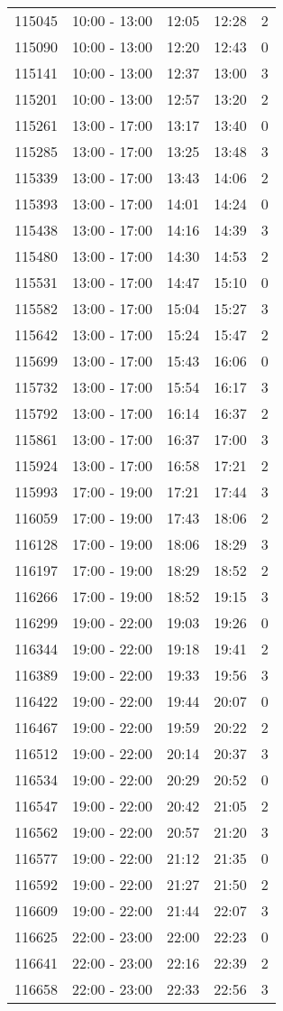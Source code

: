 \documentclass{article}
\begin{document}
\begin{tabular}{llccc}
115045 & 10:00 - 13:00 & 12:05 & 12:28 & 2 \\
115090 & 10:00 - 13:00 & 12:20 & 12:43 & 0 \\
115141 & 10:00 - 13:00 & 12:37 & 13:00 & 3 \\
115201 & 10:00 - 13:00 & 12:57 & 13:20 & 2 \\
115261 & 13:00 - 17:00 & 13:17 & 13:40 & 0 \\
115285 & 13:00 - 17:00 & 13:25 & 13:48 & 3 \\
115339 & 13:00 - 17:00 & 13:43 & 14:06 & 2 \\
115393 & 13:00 - 17:00 & 14:01 & 14:24 & 0 \\
115438 & 13:00 - 17:00 & 14:16 & 14:39 & 3 \\
115480 & 13:00 - 17:00 & 14:30 & 14:53 & 2 \\
115531 & 13:00 - 17:00 & 14:47 & 15:10 & 0 \\
115582 & 13:00 - 17:00 & 15:04 & 15:27 & 3 \\
115642 & 13:00 - 17:00 & 15:24 & 15:47 & 2 \\
115699 & 13:00 - 17:00 & 15:43 & 16:06 & 0 \\
115732 & 13:00 - 17:00 & 15:54 & 16:17 & 3 \\
115792 & 13:00 - 17:00 & 16:14 & 16:37 & 2 \\
115861 & 13:00 - 17:00 & 16:37 & 17:00 & 3 \\
115924 & 13:00 - 17:00 & 16:58 & 17:21 & 2 \\
115993 & 17:00 - 19:00 & 17:21 & 17:44 & 3 \\
116059 & 17:00 - 19:00 & 17:43 & 18:06 & 2 \\
116128 & 17:00 - 19:00 & 18:06 & 18:29 & 3 \\
116197 & 17:00 - 19:00 & 18:29 & 18:52 & 2 \\
116266 & 17:00 - 19:00 & 18:52 & 19:15 & 3 \\
116299 & 19:00 - 22:00 & 19:03 & 19:26 & 0 \\
116344 & 19:00 - 22:00 & 19:18 & 19:41 & 2 \\
116389 & 19:00 - 22:00 & 19:33 & 19:56 & 3 \\
116422 & 19:00 - 22:00 & 19:44 & 20:07 & 0 \\
116467 & 19:00 - 22:00 & 19:59 & 20:22 & 2 \\
116512 & 19:00 - 22:00 & 20:14 & 20:37 & 3 \\
116534 & 19:00 - 22:00 & 20:29 & 20:52 & 0 \\
116547 & 19:00 - 22:00 & 20:42 & 21:05 & 2 \\
116562 & 19:00 - 22:00 & 20:57 & 21:20 & 3 \\
116577 & 19:00 - 22:00 & 21:12 & 21:35 & 0 \\
116592 & 19:00 - 22:00 & 21:27 & 21:50 & 2 \\
116609 & 19:00 - 22:00 & 21:44 & 22:07 & 3 \\
116625 & 22:00 - 23:00 & 22:00 & 22:23 & 0 \\
116641 & 22:00 - 23:00 & 22:16 & 22:39 & 2 \\
116658 & 22:00 - 23:00 & 22:33 & 22:56 & 3 \\
\bottomrule
\end{tabular}
\end{document}
